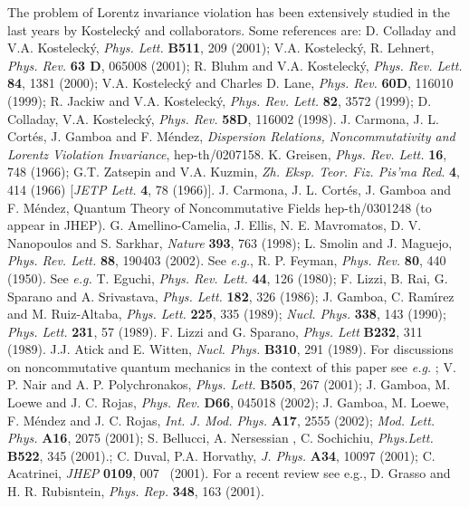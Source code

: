 \documentclass[a4paper,aps,twocolumn,amsfonts]{revtex4}
\begin{document}
 \begin{references}
  The problem of Lorentz  invariance violation has been  extensively studied in the last years by Kosteleck\'y and collaborators. Some references are:   D. Colladay and V.A. Kosteleck\'y,  {\it Phys. Lett.} {\bf B511}, 209 (2001);  V.A. Kosteleck\'y, R. Lehnert, {\it Phys. Rev.}
 {\bf 63 D}, 065008 (2001);  R. Bluhm and  V.A. Kosteleck\'y, {\it Phys. Rev. Lett.} {\bf 84}, 1381 (2000); V.A. Kosteleck\'y and  Charles D. Lane, 
 {\it Phys. Rev.} {\bf 60D}, 116010 (1999); R. Jackiw and V.A. Kosteleck\'y, {\it Phys. Rev. Lett.} {\bf 82}, 3572 (1999);  D. Colladay, V.A.  Kosteleck\'y, {\it  Phys. Rev.}   {\bf 58D}, 116002 (1998).
 J. Carmona, J. L. Cort\'es, J. Gamboa and F. M\'endez, {\it Dispersion Relations, Noncommutativity and Lorentz Violation Invariance},  hep-th/0207158.
K. Greisen, {\it Phys. Rev. Lett.} {\bf 16}, 748 (1966); G.T. Zatsepin and V.A. Kuzmin, {\it  Zh. Eksp. Teor. Fiz. Pis'ma Red}. {\bf 4}, 414 (1966) [{\it JETP Lett.} {\bf 4}, 78 (1966)].
 J. Carmona, J. L. Cort\'es, J. Gamboa and F. M\'endez, {Quantum Theory of Noncommutative Fields} hep-th/0301248 (to appear in JHEP).  
 G. Amellino-Camelia, J. Ellis, N. E. Mavromatos, D. V.  Nanopoulos and S. Sarkhar, {\it Nature} {\bf393}, 763 (1998); L. Smolin and J. Maguejo, {\it Phys. Rev. Lett.} {\bf 88}, 190403 (2002).
 See {\it e.g.}, R. P. Feyman, {\it Phys. Rev.}  {\bf 80}, 440 (1950).
 See {\it e.g.} T. Eguchi, {\it Phys. Rev. Lett.}  {\bf 44}, 126 (1980); F. Lizzi, B. Rai, G. Sparano and A. Srivastava, 
{\it Phys. Lett. } {\bf 182}, 326 (1986);  J. Gamboa, C. Ram\'{\i}rez and M. Ruiz-Altaba, {\it Phys. Lett.} {\bf 225}, 335 (1989);  {\it Nucl. Phys.} 
{\bf 338}, 143 (1990);  {\it Phys. Lett.} {\bf 231}, 57 (1989).
F. Lizzi and G. Sparano, {\it Phys. Lett} {\bf B232}, 311 (1989).
 J.J. Atick and E. Witten, {\it Nucl. Phys.} {\bf B310}, 291 (1989).
 For discussions on noncommutative quantum mechanics in the context of this paper see {\it e.g.} ;   V. P. Nair and A. P. Polychronakos, {\it Phys. Lett.} {\bf B505}, 267 (2001); J. Gamboa, M. Loewe and J. C. Rojas, {\it Phys. Rev.} {\bf D66}, 045018 (2002);  J. Gamboa, M. Loewe, F. M\'endez  and J. C. Rojas, {\it Int. J. Mod. Phys.} {\bf A17}, 
2555 (2002);  {\it Mod. Lett. Phys.} {\bf A16}, 2075 (2001); S. Bellucci, A.  Nersessian , C. Sochichiu, {\it Phys.Lett.}  {\bf B522}, 345 (2001).; C. Duval, P.A. Horvathy,  {\it J. Phys. } {\bf A34}, 10097 (2001);  C. Acatrinei, {\it JHEP} {\bf 0109}, 007~ (2001).
  For a recent review see {e.g.}, D. Grasso and H. R. Rubisntein, {\it Phys. Rep.} {\bf 348}, 163 (2001).

   
   \end{references}
   
\end{document}
